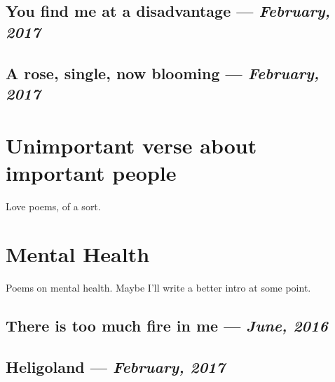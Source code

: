 \documentclass[12pt,letterpaper,oneside]{memoir}
\begin{document}
  \section{You find me at a disadvantage --- \textit{February, 2017}}

  
  \newpage


  \section{A rose, single, now blooming --- \textit{February, 2017}}

  


  \chapter{Unimportant verse about important people}

  Love poems, of a sort.
  \newpage


  


  \chapter{Mental Health}

  Poems on mental health. Maybe I'll write a better intro at some point.
  \newpage


  \section{There is too much fire in me --- \textit{June, 2016}}

  
  \newpage



  
  \onecolumn
  \newpage


  \section{Heligoland --- \textit{February, 2017}}
\end{document}
